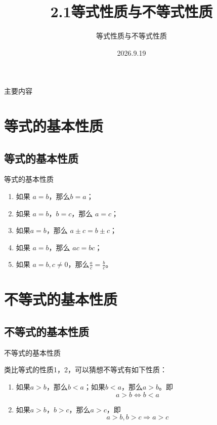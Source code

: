 \documentclass[12pt,aspectratio=169,t,fleqn]{beamer}
\title[2.1等式性质与不等式性质] %
{2.1等式性质与不等式性质}
\subtitle
{等式性质与不等式性质}
\author[好好学习，努力向上] %
{
	}
\institute[夏邑一高] %
{
 }
\date[2026.9.19] %
{2026.9.19}
\begin{document}
\begin{frame}
  \titlepage
\end{frame}

\begin{frame}{主要内容}
  \tableofcontents
\end{frame}


\section{等式的基本性质}

\subsection{等式的基本性质}

\begin{frame}{等式的基本性质}

  \begin{enumerate}
  \item    如果 $a=b$，那么$b=a$；
  \item    如果 $a=b$，$b=c$，那么 $a=c$；
  \item  	如果$a=b$，那么 $a\pm c = b \pm c$；
  \item  	如果 $a=b$，那么 $ac=bc$；
  \item 	如果 $a=b,c\neq 0$，那么$\frac{a}{c} = \frac{b}{c}$。
  \end{enumerate}
  
\end{frame}

\section{不等式的基本性质}
\subsection{不等式的基本性质}

\begin{frame}{不等式的基本性质}

  类比等式的性质1，2，可以猜想不等式有如下性质：
  \begin{enumerate}[<+->]
	\item 如果$a>b$，那么$b<a$；如果$b<a$，那么$a>b$。即
	 		 \[a>b \iff b<a\]
	    
	\item 如果$a>b$，$b>c$，那么$a>c$，即
	      \[ a>b,b>c \Rightarrow a>c\]

  \end{enumerate}
\end{frame}
\end{document}
